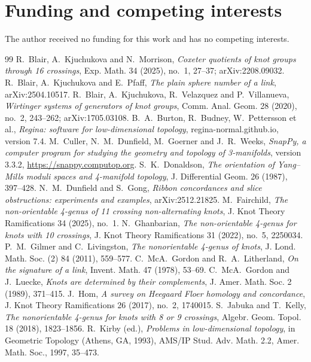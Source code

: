 \documentclass[11pt]{amsart}
\theoremstyle{definition}
\theoremstyle{remark}
\numberwithin{equation}{section}
\begin{document}
\section*{Funding and competing interests}
The author received no funding for this work and has no competing interests.

\begin{thebibliography}{99}
 R.~Blair, A.~Kjuchukova and N.~Morrison, \emph{Coxeter quotients of knot
groups through 16 crossings}, Exp. Math. 34 (2025), no.~1, 27--37; arXiv:2208.09032.
 R.~Blair, A.~Kjuchukova and E.~Pfaff, \emph{The plain sphere number of a
link}, arXiv:2504.10517.
 R.~Blair, A.~Kjuchukova, R.~Velazquez and P.~Villanueva, \emph{Wirtinger
systems of generators of knot groups}, Comm. Anal. Geom. 28 (2020), no.~2, 243--262;
arXiv:1705.03108.
 B.~A.~Burton, R.~Budney, W.~Pettersson et al., \emph{Regina: software for
low-dimensional topology}, regina-normal.github.io, version 7.4.
 M.~Culler, N.~M.~Dunfield, M.~Goerner and J.~R.~Weeks, \emph{SnapPy, a
computer program for studying the geometry and topology of 3-manifolds}, version 3.3.2,
\url{https://snappy.computop.org}.
 S.~K.~Donaldson, \emph{The orientation of Yang--Mills moduli spaces and
4-manifold topology}, J. Differential Geom. 26 (1987), 397--428.
 N.~M.~Dunfield and S.~Gong, \emph{Ribbon concordances and slice obstructions:
experiments and examples}, arXiv:2512.21825.
 M.~Fairchild, \emph{The non-orientable 4-genus of 11 crossing non-alternating
knots}, J. Knot Theory Ramifications 34 (2025), no.~1.
 N.~Ghanbarian, \emph{The non-orientable 4-genus for knots with 10 crossings},
J. Knot Theory Ramifications 31 (2022), no.~5, 2250034.
 P.~M.~Gilmer and C.~Livingston, \emph{The nonorientable 4-genus of knots},
J. Lond. Math. Soc. (2) 84 (2011), 559--577.
 C.~McA.~Gordon and R.~A.~Litherland, \emph{On the signature of a link},
Invent. Math. 47 (1978), 53--69.
 C.~McA.~Gordon and J.~Luecke, \emph{Knots are determined by their complements},
J. Amer. Math. Soc. 2 (1989), 371--415.
 J.~Hom, \emph{A survey on Heegaard Floer homology and concordance}, J. Knot
Theory Ramifications 26 (2017), no.~2, 1740015.
 S.~Jabuka and T.~Kelly, \emph{The nonorientable 4-genus for knots with 8 or 9
crossings}, Algebr. Geom. Topol. 18 (2018), 1823--1856.
 R.~Kirby (ed.), \emph{Problems in low-dimensional topology}, in Geometric
Topology (Athens, GA, 1993), AMS/IP Stud. Adv. Math. 2.2, Amer. Math. Soc., 1997, 35--473.

\end{thebibliography}
\end{document}
